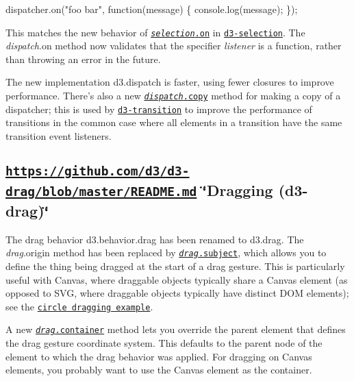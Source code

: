 \begin{DoxyCode}
dispatcher.on("foo bar", function(message) \{
  console.log(message);
\});
\end{DoxyCode}


This matches the new behavior of \href{https://github.com/d3/d3-selection/blob/master/README.md#selection_on}{\tt {\itshape selection}.on} in \href{#selections-d3-selection}{\tt d3-\/selection}. The {\itshape dispatch}.on method now validates that the specifier {\itshape listener} is a function, rather than throwing an error in the future.

The new implementation d3.\+dispatch is faster, using fewer closures to improve performance. There’s also a new \href{https://github.com/d3/d3-dispatch/blob/master/README.md#dispatch_copy}{\tt {\itshape dispatch}.copy} method for making a copy of a dispatcher; this is used by \href{#transitions-d3-transition}{\tt d3-\/transition} to improve the performance of transitions in the common case where all elements in a transition have the same transition event listeners.

\subsection*{\href{https://github.com/d3/d3-drag/blob/master/README.md}{\tt https\+://github.\+com/d3/d3-\/drag/blob/master/\+R\+E\+A\+D\+M\+E.\+md} \char`\"{}\+Dragging (d3-\/drag)\char`\"{}}

The drag behavior d3.\+behavior.\+drag has been renamed to d3.\+drag. The {\itshape drag}.origin method has been replaced by \href{https://github.com/d3/d3-drag/blob/master/README.md#drag_subject}{\tt {\itshape drag}.subject}, which allows you to define the thing being dragged at the start of a drag gesture. This is particularly useful with Canvas, where draggable objects typically share a Canvas element (as opposed to S\+VG, where draggable objects typically have distinct D\+OM elements); see the \href{https://bl.ocks.org/mbostock/444757cc9f0fde320a5f469cd36860f4}{\tt circle dragging example}.

A new \href{https://github.com/d3/d3-drag/blob/master/README.md#drag_container}{\tt {\itshape drag}.container} method lets you override the parent element that defines the drag gesture coordinate system. This defaults to the parent node of the element to which the drag behavior was applied. For dragging on Canvas elements, you probably want to use the Canvas element as the container.

